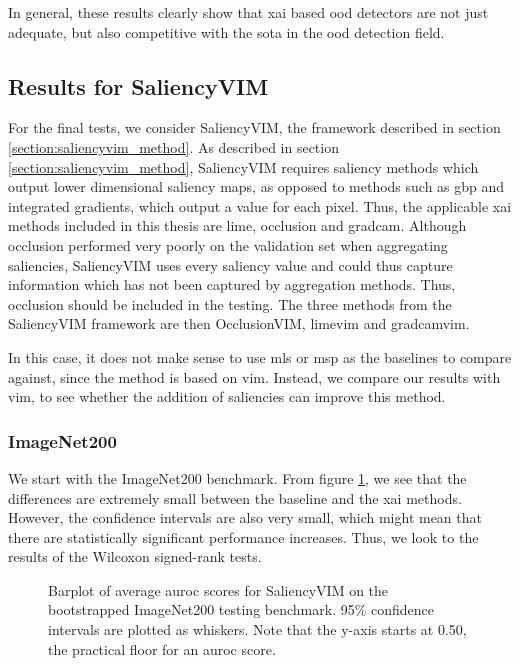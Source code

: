 \documentclass[UKenglish]{uiomasterthesis} %
\theoremstyle{definition}
\begin{document}
In general, these results clearly show that \ac{xai} based \ac{ood} detectors are not just adequate, but also competitive with the \ac{sota} in the \ac{ood} detection field.

\subsection{Results for SaliencyVIM}

For the final tests, we consider SaliencyVIM, the framework described in section \ref{section:saliencyvim_method}. As described in section \ref{section:saliencyvim_method}, SaliencyVIM requires saliency methods which output lower dimensional saliency maps, as opposed to methods such as \ac{gbp} and integrated gradients, which output a value for each pixel. Thus, the applicable \ac{xai} methods included in this thesis are \ac{lime}, occlusion and \ac{gradcam}. Although occlusion performed very poorly on the validation set when aggregating saliencies, SaliencyVIM uses every saliency value and could thus capture information which has not been captured by aggregation methods. Thus, occlusion should be included in the testing. The three methods from the SaliencyVIM framework are then OcclusionVIM, \ac{lime}\ac{vim} and \ac{gradcam}\ac{vim}. 

In this case, it does not make sense to use \ac{mls} or \ac{msp} as the baselines to compare against, since the method is based on \ac{vim}. Instead, we compare our results with \ac{vim}, to see whether the addition of saliencies can improve this method.

\subsubsection{ImageNet200}

We start with the ImageNet200 benchmark. From figure \ref{fig:imagenet200_salvim_bootstrap_barplot}, we see that the differences are extremely small between the baseline and the \ac{xai} methods. However, the confidence intervals are also very small, which might mean that there are statistically significant performance increases. Thus, we look to the results of the Wilcoxon signed-rank tests.

\begin{figure}[H]
    \begin{center}
        
    \end{center}
    \caption[ImageNet200 SaliencyVIM Bootstrap]{Barplot of average \ac{auroc} scores for SaliencyVIM on the bootstrapped ImageNet200 testing benchmark. 95\% confidence intervals are plotted as whiskers. Note that the y-axis starts at 0.50, the practical floor for an \ac{auroc} score.}
    \label{fig:imagenet200_salvim_bootstrap_barplot}
\end{figure}
\end{document}
